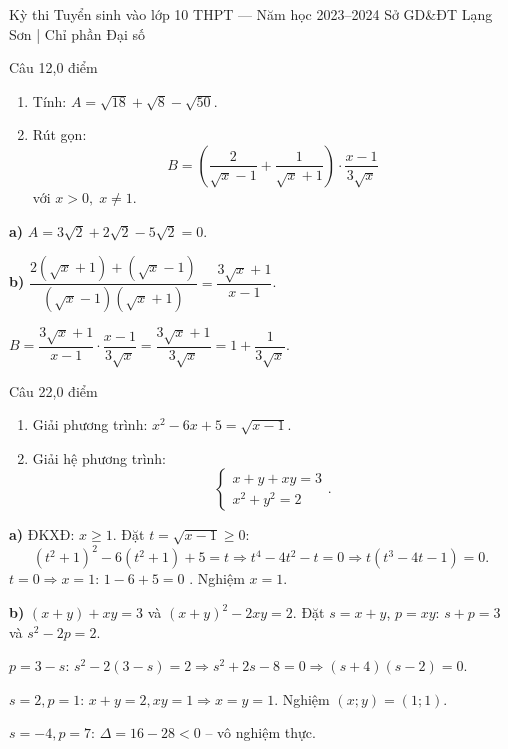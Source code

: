 ﻿%
%
  {Kỳ thi Tuyển sinh vào lớp 10 THPT — Năm học 2023--2024}%
  {Sở GD\&ĐT Lạng Sơn | Chỉ phần Đại số}

\begin{de_cau}{Câu 1}{2,0 điểm}
\begin{enumerate}[label=\alph*)]
  \item Tính: $A = \sqrt{18} + \sqrt{8} - \sqrt{50}$.
  \item Rút gọn:
  \[B = \left(\dfrac{2}{\sqrt{x}-1}+\dfrac{1}{\sqrt{x}+1}\right) \cdot \dfrac{x-1}{3\sqrt{x}}\]
  với $x > 0,\; x \neq 1$.
\end{enumerate}
\end{de_cau}

\begin{loi_giai_cau}
\textbf{a)} $A=3\sqrt{2}+2\sqrt{2}-5\sqrt{2}=\boxed{0}$.

\textbf{b)} $\dfrac{2(\sqrt{x}+1)+(\sqrt{x}-1)}{(\sqrt{x}-1)(\sqrt{x}+1)}=\dfrac{3\sqrt{x}+1}{x-1}$.

$B=\dfrac{3\sqrt{x}+1}{x-1}\cdot\dfrac{x-1}{3\sqrt{x}}=\boxed{\dfrac{3\sqrt{x}+1}{3\sqrt{x}}}=1+\dfrac{1}{3\sqrt{x}}$.
\end{loi_giai_cau}

\begin{de_cau}{Câu 2}{2,0 điểm}
\begin{enumerate}[label=\alph*)]
  \item Giải phương trình: $x^2 - 6x + 5 = \sqrt{x-1}$.
  \item Giải hệ phương trình:
  \[\begin{cases} x + y + xy = 3 \\ x^2+y^2 = 2 \end{cases}.\]
\end{enumerate}
\end{de_cau}

\begin{loi_giai_cau}
\textbf{a)} ĐKXĐ: $x\ge1$. Đặt $t=\sqrt{x-1}\ge0$:
\[(t^2+1)^2-6(t^2+1)+5=t \Rightarrow t^4-4t^2-t=0 \Rightarrow t(t^3-4t-1)=0.\]
$t=0\Rightarrow x=1$: $1-6+5=0$ \checkmark . Nghiệm $\boxed{x=1}$.

\textbf{b)} $(x+y)+xy=3$ và $(x+y)^2-2xy=2$. Đặt $s=x+y$, $p=xy$: $s+p=3$ và $s^2-2p=2$.

$p=3-s$: $s^2-2(3-s)=2\Rightarrow s^2+2s-8=0\Rightarrow(s+4)(s-2)=0$.

$s=2, p=1$: $x+y=2,xy=1\Rightarrow x=y=1$. Nghiệm $\boxed{(x;y)=(1;1)}$.

$s=-4, p=7$: $\Delta=16-28<0$ -- vô nghiệm thực.
\end{loi_giai_cau}

